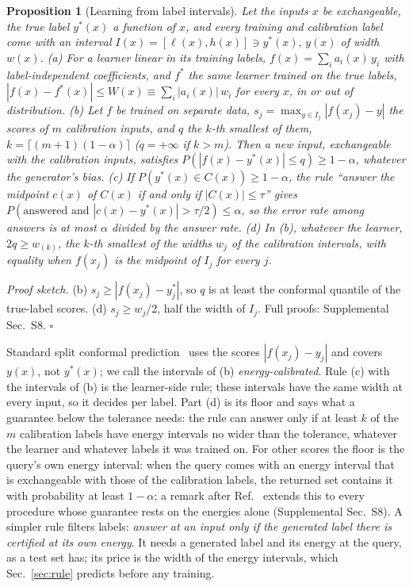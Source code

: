 \documentclass[aps,prx,twocolumn,10pt,superscriptaddress,nofootinbib,longbibliography,floatfix]{revtex4-2}
\newtheorem{proposition}{Proposition}
\theoremstyle{remark}
\begin{document}
\begin{proposition}[Learning from label intervals]
\label{prop:learn}
Let the inputs $x$ be exchangeable, the true label $y^*(x)$ a function of $x$, and every training and calibration
label come with an interval $I(x)=[\ell(x),h(x)]\ni y^*(x),\,y(x)$ of width $w(x)$.
(a) For a learner linear in its training labels, $f(x)=\sum_i a_i(x)\,y_i$ with label-independent coefficients, and
$f^*$ the same learner trained on the true labels, $|f(x)-f^*(x)|\le W(x)\equiv\sum_i|a_i(x)|\,w_i$ for
every $x$, in or out of distribution.
(b) Let $f$ be trained on separate data, $s_j=\max_{y\in I_j}|f(x_j)-y|$ the scores of $m$ calibration inputs, and
$q$ the $k$-th smallest of them, $k=\lceil(m+1)(1-\alpha)\rceil$ ($q=+\infty$ if $k>m$). Then a new input,
exchangeable with the calibration inputs, satisfies $P(|f(x)-y^*(x)|\le q)\ge1-\alpha$, whatever the generator's bias.
(c) If $P(y^*(x)\in C(x))\ge1-\alpha$, the rule ``answer the midpoint $c(x)$ of $C(x)$ if and only if
$|C(x)|\le\tau$'' gives $P(\text{answered and }|c(x)-y^*(x)|>\tau/2)\le\alpha$, so the error rate among answers is
at most $\alpha$ divided by the answer rate.
(d) In (b), whatever the learner, $2q\ge w_{(k)}$, the $k$-th smallest of the widths $w_j$ of the calibration
intervals, with equality when $f(x_j)$ is the midpoint of $I_j$ for every $j$.
\end{proposition}

\noindent\emph{Proof sketch.} (b) $s_j\ge|f(x_j)-y_j^*|$, so $q$ is at least the conformal quantile of the
true-label scores. (d) $s_j\ge w_j/2$, half the width of $I_j$. Full proofs: Supplemental Sec.~S8. $\square$

Standard split conformal prediction~\cite{angelopoulos2021} uses the scores $|f(x_j)-y_j|$ and covers $y(x)$, not
$y^*(x)$; we call the intervals of (b) \emph{energy-calibrated}. Rule (c) with the
intervals of (b) is the learner-side rule; these intervals have the same width at every input, so it decides per
label. Part (d) is its floor and says what a guarantee below the tolerance needs: the rule can answer only if at
least $k$ of the $m$ calibration labels have energy intervals no wider than the tolerance, whatever the learner and
whatever labels it was trained on. For other scores the floor is the query's own energy interval: when the query
comes with an energy interval that is exchangeable with those of the calibration labels, the returned set contains
it with probability at least $1-\alpha$; a remark after Ref.~\cite{cauchois2022} extends this to
every procedure whose guarantee rests on the energies alone (Supplemental Sec.~S8). A simpler rule filters labels:
\emph{answer at an input only if the generated label there is certified at its own energy}. It needs a generated
label and its energy at the query, as a test set has; its price is the width of the energy intervals, which
Sec.~\ref{sec:rule} predicts before any training.
\end{document}
